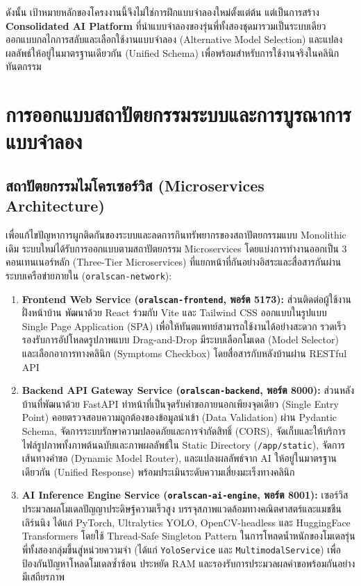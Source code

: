 ดังนั้น เป้าหมายหลักของโครงงานนี้จึงไม่ใช่การฝึกแบบจำลองใหม่ตั้งแต่ต้น แต่เป็นการสร้าง \textbf{Consolidated AI Platform} ที่นำแบบจำลองของรุ่นพี่ทั้งสองชุดมารวมเป็นระบบเดียว ออกแบบกลไกการสลับและเลือกใช้งานแบบจำลอง (Alternative Model Selection) และแปลงผลลัพธ์ให้อยู่ในมาตรฐานเดียวกัน (Unified Schema) เพื่อพร้อมสำหรับการใช้งานจริงในคลินิกทันตกรรม

\section{การออกแบบสถาปัตยกรรมระบบและการบูรณาการแบบจำลอง}
\label{sec:system_architecture_design}

\subsection{สถาปัตยกรรมไมโครเซอร์วิส (Microservices Architecture)}
เพื่อแก้ไขปัญหาการผูกติดกันของระบบและลดการกินทรัพยากรของสถาปัตยกรรมแบบ Monolithic เดิม ระบบใหม่ได้รับการออกแบบตามสถาปัตยกรรม Microservices โดยแบ่งการทำงานออกเป็น 3 คอนเทนเนอร์หลัก (Three-Tier Microservices) ที่แยกหน้าที่กันอย่างอิสระและสื่อสารกันผ่านระบบเครือข่ายภายใน (\texttt{oralscan-network}):
\begin{enumerate}
    \item \textbf{Frontend Web Service (\texttt{oralscan-frontend}, พอร์ต 5173):} ส่วนติดต่อผู้ใช้งานฝั่งหน้าบ้าน พัฒนาด้วย React ร่วมกับ Vite และ Tailwind CSS ออกแบบในรูปแบบ Single Page Application (SPA) เพื่อให้ทันตแพทย์สามารถใช้งานได้อย่างสะดวก รวดเร็ว รองรับการอัปโหลดรูปภาพแบบ Drag-and-Drop มีระบบเลือกโมเดล (Model Selector) และเลือกอาการทางคลินิก (Symptoms Checkbox) โดยสื่อสารกับหลังบ้านผ่าน RESTful API
    \item \textbf{Backend API Gateway Service (\texttt{oralscan-backend}, พอร์ต 8000):} ส่วนหลังบ้านที่พัฒนาด้วย FastAPI ทำหน้าที่เป็นจุดรับคำขอภายนอกเพียงจุดเดียว (Single Entry Point) คอยตรวจสอบความถูกต้องของข้อมูลนำเข้า (Data Validation) ผ่าน Pydantic Schema, จัดการระบบรักษาความปลอดภัยและการจำกัดสิทธิ์ (CORS), จัดเก็บและให้บริการไฟล์รูปภาพทั้งภาพต้นฉบับและภาพผลลัพธ์ใน Static Directory (\texttt{/app/static}), จัดการเส้นทางคำขอ (Dynamic Model Router), และแปลงผลลัพธ์จาก AI ให้อยู่ในมาตรฐานเดียวกัน (Unified Response) พร้อมประเมินระดับความเสี่ยงมะเร็งทางคลินิก
    \item \textbf{AI Inference Engine Service (\texttt{oralscan-ai-engine}, พอร์ต 8001):} เซอร์วิสประมวลผลโมเดลปัญญาประดิษฐ์ความเร็วสูง บรรจุสภาพแวดล้อมทางคณิตศาสตร์และแมชชีนเลิร์นนิง ได้แก่ PyTorch, Ultralytics YOLO, OpenCV-headless และ HuggingFace Transformers โดยใช้ Thread-Safe Singleton Pattern ในการโหลดน้ำหนักของโมเดลรุ่นพี่ทั้งสองกลุ่มขึ้นสู่หน่วยความจำ (ได้แก่ \texttt{YoloService} และ \texttt{MultimodalService}) เพื่อป้องกันปัญหาโหลดโมเดลซ้ำซ้อน ประหยัด RAM และรองรับการประมวลผลคำขอพร้อมกันอย่างมีเสถียรภาพ
\end{enumerate}

